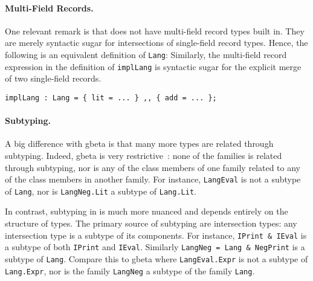 \paragraph{Multi-Field Records.} One relevant remark is that
\name does not have multi-field record types built in. They are merely syntactic
sugar for intersections of single-field record types. Hence, the following is an
equivalent definition of \lstinline{Lang}:
Similarly, the multi-field record expression in the definition of
\lstinline{implLang} is syntactic sugar for the explicit merge of two
single-field records.
\begin{lstlisting}
implLang : Lang = { lit = ... } ,, { add = ... };
\end{lstlisting}

\paragraph{Subtyping.}
A big difference with gbeta is that many more \name types are related through
subtyping. Indeed, gbeta is very restrictive~\citep{ernst_hoh}: none of the families is related
through subtyping, nor is any of the class members of one family related to any
of the class members in another family. For instance, \lstinline{LangEval} is
not a subtype of \lstinline{Lang}, nor is \lstinline{LangNeg.Lit} a subtype
of \lstinline{Lang.Lit}.

In contrast, subtyping in \name is much more nuanced and depends entirely on the
structure of types. The primary source of subtyping are intersection types:
any intersection type is a subtype of its components. For instance, 
\lstinline{IPrint & IEval} is a subtype of both \lstinline{IPrint} and
\lstinline{IEval}. Similarly \lstinline{LangNeg = Lang & NegPrint} is a subtype
of \lstinline{Lang}. Compare this to gbeta where \lstinline{LangEval.Expr} is
not a subtype of \lstinline{Lang.Expr}, nor is the family \lstinline{LangNeg} a
subtype of the family \lstinline{Lang}.

